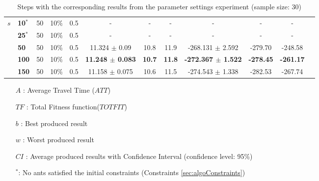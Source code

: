 \begin{sidewaystable}
\begin{tabular}{|l|l|l|l|l||c|c|c|c|c|c|c|}
    \hline
    $s$ & \textbf{10$^*$} & 50 & 10\% & 0.5  & - & - & - & - & -& - \\
    ~ & \textbf{25$^*$} & 50 & 10\% & 0.5  & - & - & - & - & - & -  \\
    ~ & \textbf{50} & 50 & 10\% & 0.5  & 11.324 $\pm$ 0.09 & 10.8 & 11.9 & -268.131 $\pm$ 2.592 & -279.70 & -248.58\\
    ~ & \textbf{100} & 50 & 10\% & 0.5 & \textbf{11.248 $\pm$ 0.083} & \textbf{10.7} & \textbf{11.8} & \textbf{-272.367 $\pm$ 1.522} & \textbf{-278.45} & \textbf{-261.17}\\
    ~ & \textbf{150} & 50 & 10\% & 0.5  & 11.158 $\pm$ 0.075 & 10.6 & 11.5 & -274.543 $\pm$ 1.338 & -282.53 & -267.74\\
    \hline
    \end{tabular}
    \caption {Steps with the corresponding results from the parameter settings experiment (sample size: 30)}
    \tiny
    \begin{itemize}[noitemsep]
    \item[$A$ :] Average Travel Time ($ATT$)
    \item[$TF$ :] Total Fitness function($TOTFIT$)
    \item[$b$ :] Best produced result
    \item[$w$ :] Worst produced result
    \item[$CI$ :] Average produced results with Confidence Interval (confidence level: 95\%)
    \item[$^*$:] No ants satisfied the initial constraints (Constraints \vref{sec:algoConstraints})
    \end{itemize}
    \label{table:pm1}
\end{sidewaystable}

